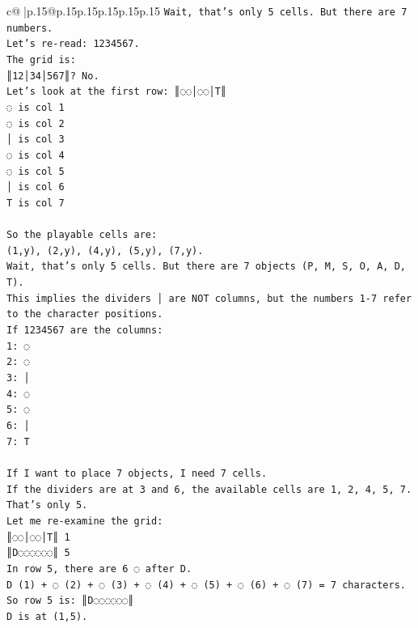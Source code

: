\documentclass{article}
\begin{document}
{\begin{supertabular}{c@{$\;$}|p{.15\linewidth}@{}p{.15\linewidth}p{.15\linewidth}p{.15\linewidth}p{.15\linewidth}p{.15\linewidth}}
{{{\texttt{Wait, that's only 5 cells. But there are 7 numbers.} \\
\texttt{Let's re{-}read: 1234567.} \\
\texttt{The grid is:} \\
\texttt{║12│34│567║? No.} \\
\texttt{Let's look at the first row: ║◌◌│◌◌│T║} \\
\texttt{◌ is col 1} \\
\texttt{◌ is col 2} \\
\texttt{│ is col 3} \\
\texttt{◌ is col 4} \\
\texttt{◌ is col 5} \\
\texttt{│ is col 6} \\
\texttt{T is col 7} \\
\\ 
\texttt{So the playable cells are:} \\
\texttt{(1,y), (2,y), (4,y), (5,y), (7,y).} \\
\texttt{Wait, that's only 5 cells. But there are 7 objects (P, M, S, O, A, D, T).} \\
\texttt{This implies the dividers │ are NOT columns, but the numbers 1{-}7 refer to the character positions.} \\
\texttt{If 1234567 are the columns:} \\
\texttt{1: ◌} \\
\texttt{2: ◌} \\
\texttt{3: │} \\
\texttt{4: ◌} \\
\texttt{5: ◌} \\
\texttt{6: │} \\
\texttt{7: T} \\
\\ 
\texttt{If I want to place 7 objects, I need 7 cells.} \\
\texttt{If the dividers are at 3 and 6, the available cells are 1, 2, 4, 5, 7. That's only 5.} \\
\texttt{Let me re{-}examine the grid:} \\
\texttt{║◌◌│◌◌│T║ 1} \\
\texttt{║D◌◌◌◌◌◌║ 5} \\
\texttt{In row 5, there are 6 ◌ after D.} \\
\texttt{D (1) + ◌ (2) + ◌ (3) + ◌ (4) + ◌ (5) + ◌ (6) + ◌ (7) = 7 characters.} \\
\texttt{So row 5 is: ║D◌◌◌◌◌◌║} \\
\texttt{D is at (1,5).} \\
}}}
\end{supertabular}}
\end{document}
